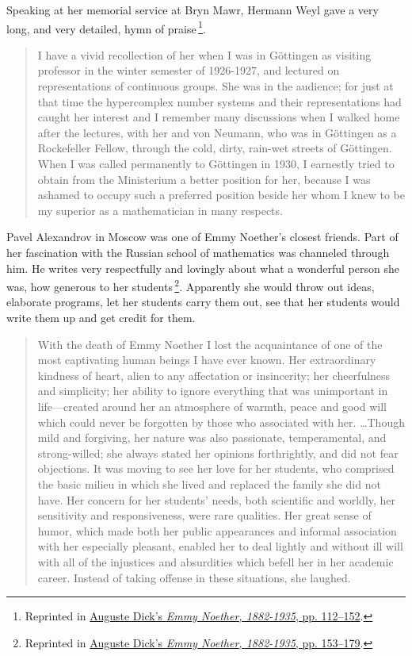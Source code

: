 \documentclass[twoside,symmetric]{tufte-handout}
\begin{document}
Speaking at her memorial service at Bryn Mawr, Hermann Weyl gave a very long, and very detailed, hymn of praise$\,$\footnote{Reprinted in \hyperref[auguste]{Auguste Dick's \emph{Emmy Noether, 1882-1935}, pp. 112--152}.}.
\begin{quote}
I have a vivid recollection of her when I was in G\"ottingen as visiting professor in the winter semester of 1926-1927, and lectured on representations of continuous groups. She was in the audience; for just at that time the hypercomplex number systems and their representations had caught her interest and I remember many discussions when I walked home after the lectures, with her and von Neumann, who was in G\"ottingen as a Rockefeller Fellow, through the cold, dirty, rain-wet streets of G\"ottingen. When I was called permanently to G\"ottingen in 1930, I earnestly tried to obtain from the Ministerium a better position for her, because I was ashamed to occupy such a preferred position beside her whom I knew to be my superior as a mathematician in many respects.
\end{quote}

Pavel Alexandrov in Moscow was one of Emmy Noether's closest friends. Part of her fascination with the Russian school of mathematics was channeled through him. He writes very respectfully and lovingly about what a wonderful person she was, how generous to her students$\,$\footnote{Reprinted in \hyperref[auguste]{Auguste Dick's \emph{Emmy Noether, 1882-1935}, pp. 153--179}.}. Apparently she would throw out ideas, elaborate programs, let her students carry them out, see that her students would write them up and get credit for them.
\begin{quote}
With the death of Emmy Noether I lost the acquaintance of one of the most captivating human beings I have ever known. Her extraordinary kindness of heart, alien to any affectation or insincerity; her cheerfulness and simplicity; her ability to ignore everything that was unimportant in life---created around her an atmosphere of warmth, peace and good will which could never be forgotten by those who associated with her.  \ldots Though mild and forgiving, her nature was also passionate, temperamental, and strong-willed; she always stated her opinions forthrightly, and did not fear objections. It was moving to see her love for her students, who comprised the basic milieu in which she lived and replaced the family she did not have. Her concern for her students' needs, both scientific and worldly, her sensitivity and responsiveness, were rare qualities. Her great sense of humor, which made both her public appearances and informal association with her especially pleasant, enabled her to deal lightly and without ill will with all of the injustices and absurdities which befell her in her academic career. Instead of taking offense in these situations, she laughed.
\end{quote}
\end{document}
